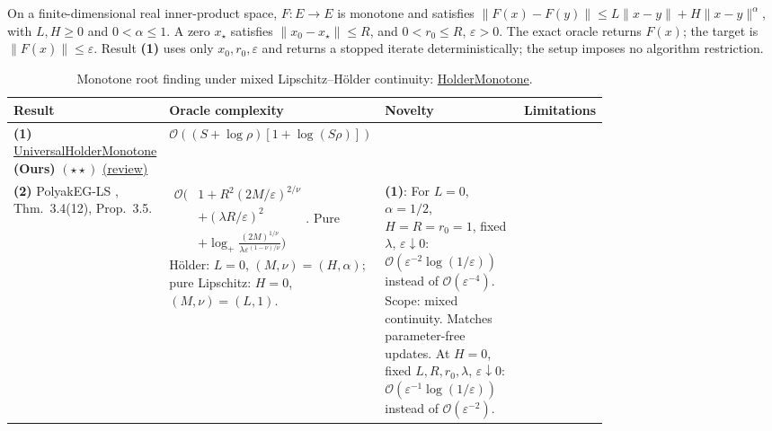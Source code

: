 \begin{table}[tp]
\centering
\caption{Monotone root finding under mixed Lipschitz--H\"older continuity: \href{https://github.com/k3nfalt/longtails/blob/main/LongTails/Setups/HolderMonotone.lean}{HolderMonotone}.}\label{tab:HolderMonotone}
\parbox{\linewidth}{\footnotesize On a finite-dimensional real inner-product space, $F:E\to E$ is monotone and satisfies $\|F(x)-F(y)\|\le L\|x-y\|+H\|x-y\|^\alpha$, with $L,H\ge0$ and $0<\alpha\le1$. A zero $x_\star$ satisfies $\|x_0-x_\star\|\le R$, and $0<r_0\le R$, $\varepsilon>0$. The exact oracle returns $F(x)$; the target is $\|F(\hat x)\|\le\varepsilon$. Result \textbf{(1)} uses only $x_0,r_0,\varepsilon$ and returns a stopped iterate deterministically; the setup imposes no algorithm restriction.}\par\smallskip
\begin{threeparttable}
\footnotesize
\setlength{\tabcolsep}{4pt}\renewcommand{\arraystretch}{1.25}
\begin{tabularx}{\linewidth}{@{}>{\raggedright\arraybackslash}p{0.20\linewidth}>{\raggedright\arraybackslash}p{0.32\linewidth}>{\raggedright\arraybackslash}p{0.25\linewidth}>{\raggedright\arraybackslash}X@{}}
\toprule
\textbf{Result} & \textbf{Oracle complexity} & \textbf{Novelty} & \textbf{Limitations} \\
\midrule
\textbf{(1)} \href{https://github.com/k3nfalt/longtails/blob/main/LongTails/Theorems/UniversalHolderMonotone.lean}{Universal\allowbreak Holder\allowbreak Monotone} \textbf{(Ours)} $(\star\star)$ \href{https://github.com/k3nfalt/longtails/blob/main/scripts/reviews/UniversalHolderMonotone.md}{(review)}
& $\mathcal{O}\!\left((S+\log\rho)[1+\log(S\rho)]\right)$ & & \\
\midrule[1.2pt]
\textbf{(2)} PolyakEG-LS \citep{hmYoon2026v1}, Thm.~3.4(12), Prop.~3.5.
& $\begin{aligned}\mathcal{O}\bigl(&1+R^2(2M/\varepsilon)^{2/\nu}\\&+(\lambda R/\varepsilon)^2\\&+\log_+\!\tfrac{(2M)^{1/\nu}}{\lambda\varepsilon^{(1-\nu)/\nu}}\bigr)\end{aligned}$.
Pure H\"older: $L=0$, $(M,\nu)=(H,\alpha)$; pure Lipschitz: $H=0$, $(M,\nu)=(L,1)$.
& \textbf{(1)}: For $L=0$, $\alpha=1/2$, $H=R=r_0=1$, fixed $\lambda$, $\varepsilon\downarrow0$: $\mathcal{O}(\varepsilon^{-2}\log(1/\varepsilon))$ instead of $\mathcal{O}(\varepsilon^{-4})$. Scope: mixed continuity. Matches parameter-free updates. At $H=0$, fixed $L,R,r_0,\lambda$, $\varepsilon\downarrow0$: $\mathcal{O}(\varepsilon^{-1}\log(1/\varepsilon))$ instead of $\mathcal{O}(\varepsilon^{-2})$. & \\

\end{tabularx}
\end{threeparttable}
\end{table}
